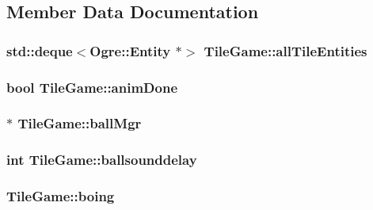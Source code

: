 \subsection{Member Data Documentation}
\hypertarget{classTileGame_a0308b658e89712b0dfbe5998495f9cec}{
\subsubsection[{all\-Tile\-Entities}]{\setlength{\rightskip}{0pt plus 5cm}std\-::deque$<$Ogre\-::\-Entity $\ast$$>$ Tile\-Game\-::all\-Tile\-Entities\hspace{0.3cm}{\ttfamily [protected]}}}\label{classTileGame_a0308b658e89712b0dfbe5998495f9cec}
\hypertarget{classTileGame_abdd2197b16e59e2035984882aaebf9e3}{
\subsubsection[{anim\-Done}]{\setlength{\rightskip}{0pt plus 5cm}bool Tile\-Game\-::anim\-Done\hspace{0.3cm}{\ttfamily [protected]}}}\label{classTileGame_abdd2197b16e59e2035984882aaebf9e3}
\hypertarget{classTileGame_a7fe1ce6963e7ac2bd5022e653368c0ed}{
\subsubsection[{ball\-Mgr}]{$\ast$ Tile\-Game\-::ball\-Mgr\hspace{0.3cm}{\ttfamily [protected]}}}\label{classTileGame_a7fe1ce6963e7ac2bd5022e653368c0ed}
\hypertarget{classTileGame_ad2760c41885714fa60f8c8b6fd0276b2}{
\subsubsection[{ballsounddelay}]{\setlength{\rightskip}{0pt plus 5cm}int Tile\-Game\-::ballsounddelay\hspace{0.3cm}{\ttfamily [protected]}}}\label{classTileGame_ad2760c41885714fa60f8c8b6fd0276b2}
\hypertarget{classTileGame_a796c40847db5cd687417574064fbd90d}{
\subsubsection[{boing}]{ Tile\-Game\-::boing\hspace{0.3cm}{\ttfamily [protected]}}}\label{classTileGame_a796c40847db5cd687417574064fbd90d}
